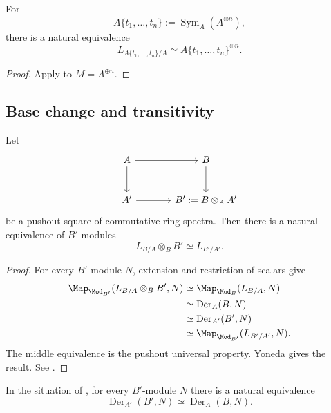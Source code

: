 \begin{corollary}
\label{cor:cotangent-brave-affine-space}
For
\[
    A\{t_1,\ldots,t_n\}
    :=
    \operatorname{Sym}_A(A^{\oplus n}),
\]
there is a natural equivalence
\[
    L_{A\{t_1,\ldots,t_n\}/A}
    \simeq
    A\{t_1,\ldots,t_n\}^{\oplus n}.
\]
\end{corollary}

\begin{proof}
Apply  to $M=A^{\oplus n}$.
\end{proof}

\subsection{Base change and transitivity}

\begin{theorem}
\label{thm:cotangent-base-change}
Let
\[
\begin{tikzcd}[column sep=large, row sep=large]
    A
        \arrow[r]
        \arrow[d]
    &
    B
        \arrow[d]
    \\
    A'
        \arrow[r]
    &
    B':=B\otimes_AA'
\end{tikzcd}
\]
be a pushout square of commutative ring spectra. Then there is a natural
equivalence of $B'$-modules
\[
    L_{B/A}\otimes_BB'
    \simeq
    L_{B'/A'}.
\]
\end{theorem}

\begin{proof}
For every $B'$-module $N$, extension and restriction of scalars give
\[
\begin{aligned}
    \Map_{\Mod_{B'}}(L_{B/A}\otimes_BB',N)
    &\simeq
    \Map_{\Mod_B}(L_{B/A},N)
    \\
    &\simeq
    \operatorname{Der}_A(B,N)
    \\
    &\simeq
    \operatorname{Der}_{A'}(B',N)
    \\
    &\simeq
    \Map_{\Mod_{B'}}(L_{B'/A'},N).
\end{aligned}
\]
The middle equivalence is the pushout universal property. Yoneda gives
the result. See
\cite[Proposition~7.3.3.7]{LurieHigherAlgebra}.
\end{proof}

\begin{corollary}
\label{cor:derivation-base-change}
In the situation of , for every
$B'$-module $N$ there is a natural equivalence
\[
    \operatorname{Der}_{A'}(B',N)
    \simeq
    \operatorname{Der}_A(B,N).
\]
\end{corollary}

